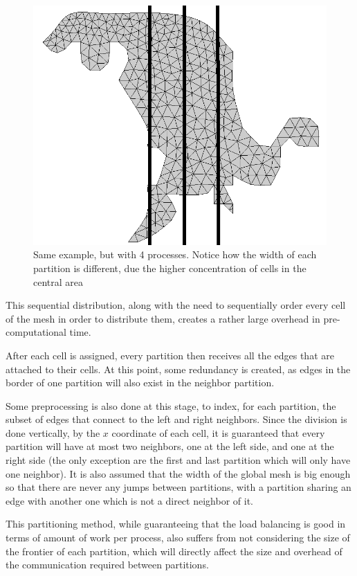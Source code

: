 \begin{figure}[!htp]
	\begin{center}
		\includegraphics[width=\columnwidth]{report.may/images/foz_p4_msh}
	\end{center}
	\caption{Same example, but with 4 processes. Notice how the width of each partition is different, due the higher concentration of cells in the central area}
	\label{fig:tasktimeAOS}
\end{figure}

This sequential distribution, along with the need to sequentially order every cell of the mesh in order to distribute them, creates a rather large overhead in pre-computational time.

After each cell is assigned, every partition then receives all the edges that are attached to their cells. At this point, some redundancy is created, as edges in the border of one partition will also exist in the neighbor partition.

Some preprocessing is also done at this stage, to index, for each partition, the subset of edges that connect to the left and right neighbors. Since the division is done vertically, by the $x$ coordinate of each cell, it is guaranteed that every partition will have at most two neighbors, one at the left side, and one at the right side (the only exception are the first and last partition which will only have one neighbor). It is also assumed that the width of the global mesh is big enough so that there are never any jumps between partitions, with a partition sharing an edge with another one which is not a direct neighbor of it.

This partitioning method, while guaranteeing that the load balancing is good in terms of amount of work per process, also suffers from not considering the size of the frontier of each partition, which will directly affect the size and overhead of the communication required between partitions.
